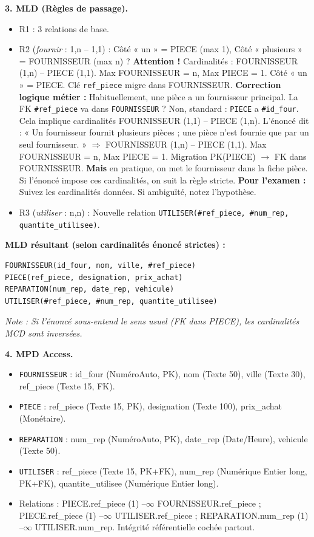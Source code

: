 \documentclass[11pt]{article}
\begin{document}
\begin{corrige}
\textbf{3. MLD (Règles de passage).}
\begin{itemize}
\item R1 : 3 relations de base.
\item R2 (\emph{fournir} : 1,n -- 1,1) : Côté « un » = PIECE (max 1), Côté « plusieurs » = FOURNISSEUR (max n) ? \textbf{Attention !} Cardinalités : FOURNISSEUR (1,n) -- PIECE (1,1). Max FOURNISSEUR = n, Max PIECE = 1. Côté « un » = PIECE. Clé \texttt{ref\_piece} migre dans FOURNISSEUR.
\textbf{Correction logique métier :} Habituellement, une pièce a un fournisseur principal. La FK \texttt{\#ref\_piece} va dans \texttt{FOURNISSEUR} ? Non, standard : \texttt{PIECE} a \texttt{\#id\_four}. Cela implique cardinalités FOURNISSEUR (1,1) -- PIECE (1,n). L'énoncé dit : « Un fournisseur fournit plusieurs pièces ; une pièce n'est fournie que par un seul fournisseur. » $\Rightarrow$ FOURNISSEUR (1,n) -- PIECE (1,1). Max FOURNISSEUR = n, Max PIECE = 1. Migration PK(PIECE) $\to$ FK dans FOURNISSEUR.
\textbf{Mais} en pratique, on met le fournisseur dans la fiche pièce. Si l'énoncé impose ces cardinalités, on suit la règle stricte.
\textbf{Pour l'examen :} Suivez les cardinalités données. Si ambiguïté, notez l'hypothèse.
\item R3 (\emph{utiliser} : n,n) : Nouvelle relation \texttt{UTILISER(\#ref\_piece, \#num\_rep, quantite\_utilisee)}.
\end{itemize}
\textbf{MLD résultant (selon cardinalités énoncé strictes) :}
\begin{lstlisting}
FOURNISSEUR(id_four, nom, ville, #ref_piece)
PIECE(ref_piece, designation, prix_achat)
REPARATION(num_rep, date_rep, vehicule)
UTILISER(#ref_piece, #num_rep, quantite_utilisee)
\end{lstlisting}
\textit{Note : Si l'énoncé sous-entend le sens usuel (FK dans PIECE), les cardinalités MCD sont inversées.}

\textbf{4. MPD Access.}
\begin{itemize}
\item \texttt{FOURNISSEUR} : id\_four (NuméroAuto, PK), nom (Texte 50), ville (Texte 30), ref\_piece (Texte 15, FK).
\item \texttt{PIECE} : ref\_piece (Texte 15, PK), designation (Texte 100), prix\_achat (Monétaire).
\item \texttt{REPARATION} : num\_rep (NuméroAuto, PK), date\_rep (Date/Heure), vehicule (Texte 50).
\item \texttt{UTILISER} : ref\_piece (Texte 15, PK+FK), num\_rep (Numérique Entier long, PK+FK), quantite\_utilisee (Numérique Entier long).
\item Relations : PIECE.ref\_piece (1) --$\infty$ FOURNISSEUR.ref\_piece ; PIECE.ref\_piece (1) --$\infty$ UTILISER.ref\_piece ; REPARATION.num\_rep (1) --$\infty$ UTILISER.num\_rep. Intégrité référentielle cochée partout.
\end{itemize}


\end{corrige}
\end{document}
